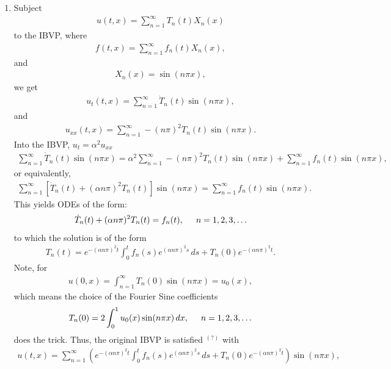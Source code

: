 \documentclass{book}
\theoremstyle{definition}
\begin{document}
\begin{enumerate}
	
	\item Subject
	\begin{align*}
	u(t,x) = \sum^\infty_{n=1}T_n(t)X_n(x)
	\end{align*}
	to the IBVP, where
	\begin{align*}
	f(t,x) = \sum_{n=1}^\infty f_n(t)X_n(x),
	\end{align*}
	and
	\begin{align*}
	X_n(x) = \sin(n\pi x),
	\end{align*}
	we get
	\begin{align*}
	u_t(t,x) = \sum^\infty_{n=1}\dot{T}_n(t)\sin(n\pi x),
	\end{align*}
	and
	\begin{align*}
	u_{xx}(t,x) = \sum^{\infty}_{n=1}-(n\pi)^2T_n(t)\sin(n\pi x).
	\end{align*}
	Into the IBVP, $u_t = \alpha^2 u_{xx}$
	\begin{align*}
	\sum^\infty_{n=1}\dot{T}_n(t)\sin(n\pi x) = \alpha^2 \sum^{\infty}_{n=1}-(n\pi)^2T_n(t)\sin(n\pi x) + \sum_{n=1}^\infty f_n(t)\sin(n\pi x),
	\end{align*}
	or equivalently,
	\begin{align*}
	\sum^\infty_{n=1}\left[\dot{T}_n(t) + (\alpha n\pi)^2T_n(t)\right]\sin(n\pi x) = \sum_{n=1}^\infty f_n(t)\sin(n\pi x).
	\end{align*}
	This yields ODEs of the form:
	\begin{align*}
	\dot{T}_n(t) + (\alpha n\pi)^2T_n(t) = f_n(t),\hspace{0.5cm}n=1,2,3,\dots
	\end{align*}
	to which the solution is of the form
	\begin{align*}
	T_n(t) = e^{-(\alpha n\pi)^2t}\int_0^t f_n(s) e^{(\alpha n \pi)^2s} \,ds + T_n(0)e^{-(\alpha n \pi)^2t}. 
	\end{align*}
	Note, for
	\begin{align*}
	u(0,x) = \int^\infty_{n=1} T_n(0)\sin(n\pi x) = u_0(x),
	\end{align*}
	which means the choice of the Fourier Sine coefficients
	\begin{align*}
	T_n(0) = 2\int^1_0 u_0(x)\sin(n\pi x)\,dx, \hspace{0.5cm}n=1,2,3,\dots
	\end{align*}
	does the trick. Thus, the original IBVP is satisfied $^{(?)}$ with
	\begin{align*}
	u(t,x) = \sum^\infty_{n=1} \left(e^{-(\alpha n\pi)^2t}\int_0^t f_n(s) e^{(\alpha n \pi)^2s} \,ds + T_n(0)e^{-(\alpha n \pi)^2t}\right)\sin(n\pi x),

\end{align*}
\end{enumerate}
\end{document}
